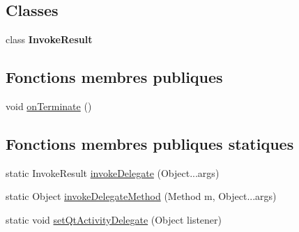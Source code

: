 \subsection*{Classes}
\begin{DoxyCompactItemize}
\item 
class {\bfseries Invoke\-Result}
\end{DoxyCompactItemize}
\subsection*{Fonctions membres publiques}
\begin{DoxyCompactItemize}
\item 
void \hyperlink{classorg_1_1qtproject_1_1qt5_1_1android_1_1bindings_1_1_qt_application_a643840ad1a423ebcae10f20c6dcf98d0}{on\-Terminate} ()
\end{DoxyCompactItemize}
\subsection*{Fonctions membres publiques statiques}
\begin{DoxyCompactItemize}
\item 
static Invoke\-Result \hyperlink{classorg_1_1qtproject_1_1qt5_1_1android_1_1bindings_1_1_qt_application_a8e4549506cfd078644266970e25dd1c5}{invoke\-Delegate} (Object...\-args)
\item 
static Object \hyperlink{classorg_1_1qtproject_1_1qt5_1_1android_1_1bindings_1_1_qt_application_a2c90af718c6bbd962d96589337a754ea}{invoke\-Delegate\-Method} (Method m, Object...\-args)
\item 
static void \hyperlink{classorg_1_1qtproject_1_1qt5_1_1android_1_1bindings_1_1_qt_application_ac47f64e358a18d99b3f41756fe4a7849}{set\-Qt\-Activity\-Delegate} (Object listener)
\end{DoxyCompactItemize}
